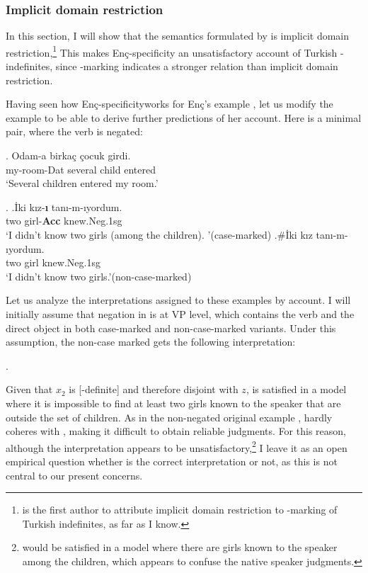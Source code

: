 \documentclass[11pt,a4paper]{article}
\newcommand{\encspec}{Enç-specific}
\begin{document}
\subsubsection{Implicit domain restriction} \label{sccontraenc}
\label{scencneg}

In this section, I will show that the semantics formulated by
 is implicit domain restriction,\footnote{
is the first author to attribute implicit domain restriction to
\acc-marking of Turkish indefinites, as far as I know.} This makes
\encspec{ity} an unsatisfactory account of Turkish \acc-indefinites,
since \acc-marking indicates a stronger relation than implicit domain
restriction.

Having seen how \encspec{ity}works for Enç's example , let
us modify the example to be able to derive further predictions of her
account. Here is a minimal pair, where the verb  is
negated:

\exg.\label{exenc16neg}%
{Odam-a}  {birka\c{c}} {\c{c}ocuk} {girdi.}\\
{my-room-Dat} {several}  {child}  {entered}\\
`Several children entered my room.'

\ex.\label{exenc17neg}
\ag.\label{exencnegacc}{\.Iki}  {k\i{}z-\textbf{\i}} {tan\i{}-m-ıyordum}.\\
{two}  {girl-{\bf Acc}}  {knew.Neg.1sg}\\
`I didn't know two girls (among the children). '\hfill (case-marked)
\bg.\label{exencnegzero}\#{\.Iki}  {k\i{}z}  {tan\i{}-m-ıyordum.} \\
{two}  {girl}  {knew.Neg.1sg}\\
`I didn't know two girls.'\hfill (non-case-marked)

Let us analyze the interpretations assigned to these examples by
 account. I will initially assume that negation in
 is at VP level, which contains the verb and the
direct object in both case-marked and non-case-marked variants. Under
this assumption, the non-case marked  gets the
following interpretation:

\ex.\label{exencnegzerodrs}

Given that $x_2$ is [-definite] and therefore disjoint with $z$,
 is satisfied in a model where it is impossible
to find at least two girls known to the speaker that are outside the
set of children.   As in the non-negated original example
,  hardly coheres with
, making it difficult to obtain reliable judgments.
For this reason, although the interpretation appears to be
unsatisfactory,\footnote{ would be satisfied in
a model where there are girls known to the speaker among the children,
which appears to confuse the native speaker judgments.} I leave it as
an open empirical question whether  is the
correct interpretation or not, as this is not central to our present
concerns.
\end{document}
